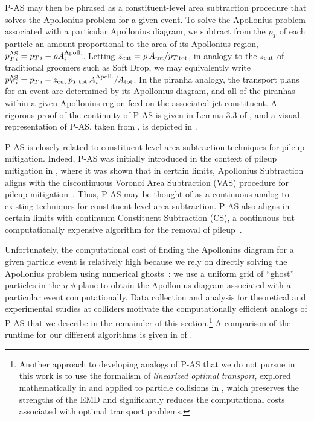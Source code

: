 P-AS may then be phrased as a constituent-level area subtraction procedure that solves the Apollonius problem for a given event.
%
To solve the Apollonius problem associated with a particular Apollonius diagram, we subtract from the \(p_T\) of each particle an amount proportional to the area of its Apollonius region,
\(p_{T\,i}^{\rm AS} = p_{T\,i} - \rho A_i^{\rm Apoll.}\).
%
Letting \(z_{\rm cut} = \rho \, A_{\rm tot} / p_{T\,{\rm tot}}\), in analogy to the \(z_{\rm cut}\) of traditional groomers such as Soft Drop, we may equivalently write
\(p_{T\,i}^{\rm AS} = p_{T\,i} - z_{\rm cut}\,p_{T\,{\rm tot}}\,A_i^{\rm Apoll.} / A_{\rm tot}\).
%
In the piranha analogy, the transport plans for an event are determined by its Apollonius diagram, and all of the piranhas within a given Apollonius region feed on the associated jet constituent.
%
A rigorous proof of the continuity of P-AS is given in \href{https://arxiv.org/pdf/1706.07403.pdf#page=15&zoom=100,0,200}{Lemma 3.3} of , and a visual representation of P-AS, taken from , is depicted in .


P-AS is closely related to constituent-level area subtraction techniques for pileup mitigation.
%
Indeed, P-AS was initially introduced in the context of pileup mitigation in , where it was shown that in certain limits, Apollonius Subtraction aligns with the discontinuous Voronoi Area Subtraction (VAS) procedure for pileup mitigation~\cite{Cacciari:2007fd, Cacciari:2008gn, Cacciari:2011ma}.
%
Thus, P-AS may be thought of as a continuous analog to existing techniques for constituent-level area subtraction.
%
P-AS also aligns in certain limits with continuum Constituent Subtraction (CS), a continuous but computationally expensive algorithm for the removal of pileup~\cite{Berta:2014eza, Komiske:2020qhg}.

Unfortunately, the computational cost of finding the Apollonius diagram for a given particle event is relatively high because we rely on directly solving the Apollonius problem using numerical ghosts~\cite{Komiske:2020qhg}:
%
we use a uniform grid of ``ghost'' particles in the \(\eta\)-\(\phi\) plane to obtain the Apollonius diagram associated with a particular event computationally.
%
Data collection and analysis for theoretical and experimental studies at colliders motivate the computationally efficient analogs of P-AS that we describe in the remainder of this section.\footnote{Another approach to developing analogs of P-AS that we do not pursue in this work is to use the formalism of \textit{linearized optimal transport}, explored mathematically in  and applied to particle collisions in , which preserves the strengths of the EMD and significantly reduces the computational costs associated with optimal transport problems.}
%
A comparison of the runtime for our different \PIRANHA{} algorithms is given in  of .

